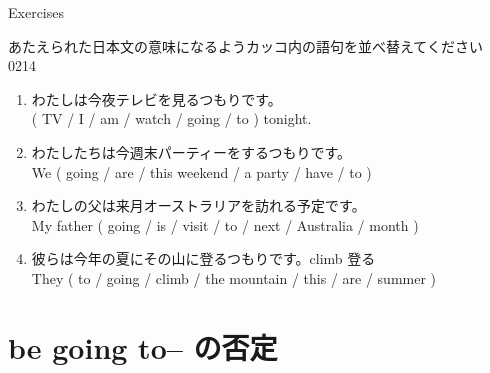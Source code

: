 \documentclass[aspectratio=169,xcolor={dvipsnames,table}]{beamer}
\newcommand{\myaudio}[1]{\href{#1}{\faVolumeUp}}
\begin{document}
\begin{frame}[plain]{Exercises}

 {\small あたえられた日本文の意味になるようカッコ内の語句を並べ替えてください}\hfill{\tiny 0214}\,{\scriptsize \myaudio{./audio/011_be_going_to_02.mp3}}


\begin{enumerate}
 \item わたしは今夜テレビを見るつもりです。\\
( TV / I / am / watch / going / to ) tonight.\\
 \item わたしたちは今週末パーティーをするつもりです。\\
We ( going / are / this weekend / a party / have / to )\\
 \item わたしの父は来月オーストラリアを訪れる予定です。\\
My father ( going / is / visit / to / next / Australia / month )\\
 \item 彼らは今年の夏にその山に登るつもりです。\hfill{\scriptsize climb  登る}\\
They ( to / going / climb / the mountain / this / are / summer )\\
\end{enumerate}
\end{frame}

\section{be going to-- の否定}
\end{document}
